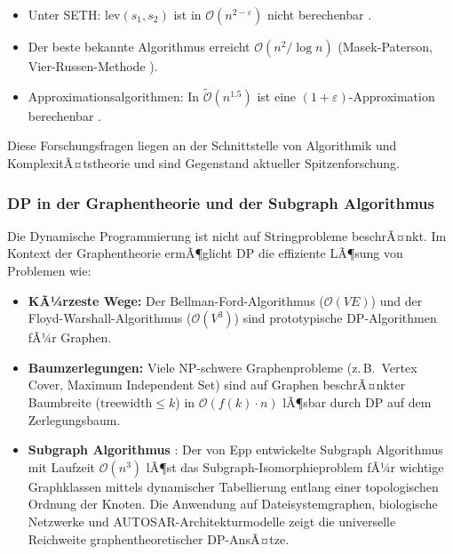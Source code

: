 ﻿\documentclass[a4paper,12pt]{article}
\theoremstyle{definition}
\begin{document}
\begin{itemize}
    \item Unter SETH: $\mathrm{lev}(s_1, s_2)$ ist in $\mathcal{O}(n^{2-\varepsilon})$
          nicht berechenbar \cite{backurs2015}.
    \item Der beste bekannte Algorithmus erreicht $\mathcal{O}(n^2 / \log n)$
          (Masek-Paterson, Vier-Russen-Methode \cite{masek1980}).
    \item Approximationsalgorithmen: In $\tilde{\mathcal{O}}(n^{1.5})$ ist eine
          $(1+\varepsilon)$-Approximation berechenbar \cite{bar2004}.
\end{itemize}

Diese Forschungsfragen liegen an der Schnittstelle von Algorithmik und
KomplexitÃ¤tstheorie und sind Gegenstand aktueller Spitzenforschung.

\subsubsection{DP in der Graphentheorie und der Subgraph Algorithmus}

Die Dynamische Programmierung ist nicht auf Stringprobleme beschrÃ¤nkt. Im Kontext
der Graphentheorie ermÃ¶glicht DP die effiziente LÃ¶sung von Problemen wie:
\begin{itemize}
    \item \textbf{KÃ¼rzeste Wege:} Der Bellman-Ford-Algorithmus \cite{bellman1958}
          ($\mathcal{O}(VE)$) und der Floyd-Warshall-Algorithmus \cite{floyd1962}
          ($\mathcal{O}(V^3)$) sind prototypische DP-Algorithmen fÃ¼r Graphen.
    \item \textbf{Baumzerlegungen:} Viele NP-schwere Graphenprobleme
          (z.\,B.\ Vertex Cover, Maximum Independent Set) sind auf Graphen
          beschrÃ¤nkter Baumbreite ($\mathrm{treewidth} \leq k$) in
          $\mathcal{O}(f(k) \cdot n)$ lÃ¶sbar durch DP auf dem Zerlegungsbaum.
    \item \textbf{Subgraph Algorithmus} \cite{epp2026subgraph}: Der von Epp
          entwickelte Subgraph Algorithmus mit Laufzeit $\mathcal{O}(n^3)$
          lÃ¶st das Subgraph-Isomorphieproblem fÃ¼r wichtige Graphklassen
          mittels dynamischer Tabellierung entlang einer topologischen Ordnung
          der Knoten. Die Anwendung auf Dateisystemgraphen, biologische Netzwerke
          und AUTOSAR-Architekturmodelle zeigt die universelle Reichweite
          graphentheoretischer DP-AnsÃ¤tze.
\end{itemize}
\end{document}
